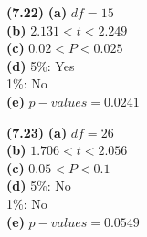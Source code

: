 \documentclass[11pt]{article}
\renewcommand\part[1]{\vspace{.10in}\textbf{(#1)}}
\begin{document}
	\part{7.22}
		\part{a}
			$df=15$\\
		\part{b}	
			$2.131 < t < 2.249$\\
		\part{c}
			$0.02<P<0.025$\\
		\part{d}
			5\%: Yes\\
			1\%: No\\
		\part{e}
			 $p-values = 0.0241$\par
	
	\part{7.23}
		\part{a}
			$df=26$\\
		\part{b}	
			$1.706 < t < 2.056$\\
		\part{c}
			$0.05<P<0.1$\\
		\part{d}
			5\%: No\\
			1\%: No\\
		\part{e}
			 $p-values = 0.0549$\\
		
\end{document}
